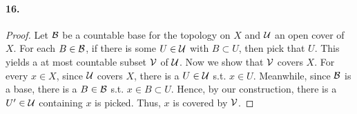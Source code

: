 \paragraph{16.}
\begin{proof}
  Let $\mathcal{B}$ be a countable base for the topology on $X$ and 
  $\mathcal{U}$ an open cover of $X$. For each $B\in\mathcal{B}$, if there is
  some $U \in \mathcal{U}$ with $B \subset U$, then pick that $U$. This yields
  a at most countable subset $\mathcal{V}$ of $\mathcal{U}$. Now we show that 
  $\mathcal{V}$ covers $X$. For every $x\in X$, since $\mathcal{U}$ covers $X$, there
  is a $U\in\mathcal{U}$ s.t. $x\in U$. Meanwhile, since $\mathcal{B}$ is a base, 
  there is a $B \in \mathcal{B}$ s.t. $x\in B \subset U$. Hence, by our
  construction, there is a $U^\prime \in \mathcal{U}$ containing $x$ is picked. Thus,
  $x$ is covered by $\mathcal{V}$.
\end{proof}























